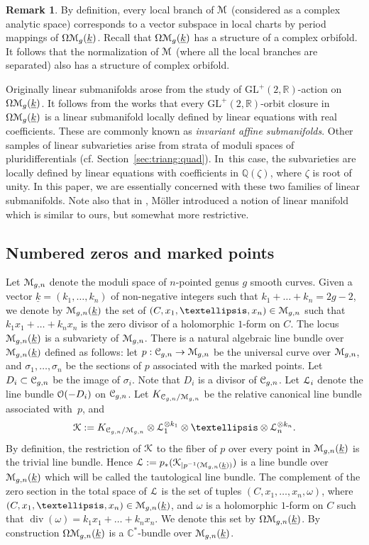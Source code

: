 \documentclass[11pt]{article}
\newcommand{\cf}{cf.\xspace}
\numberwithin{equation}{section}
\let\mathcal\EuScript
\DeclareMathOperator{\Div}{div}
\theoremstyle{plain}
\theoremstyle{definition}
\newtheorem{Remark}[Theorem]{Remark}
\newcommand{\R}{\mathbb{R}}
\def\C{\mathbb{C}}
\newcommand{\Q}{\mathbb{Q}}
\newcommand{\Ccal}{\mathcal{C}}
\newcommand{\Kcal}{\mathcal{K}}
\newcommand{\Lcal}{\mathcal{L}}
\newcommand{\Mcal}{\mathcal{M}}
\newcommand{\Ocal}{\mathcal{O}}
\newcommand{\cM}{\mathcal{M}}
\newcommand{\GL}{\mathrm{GL}}
\let\omg\omega
\let\ul\underline
\newcommand{\trate}{\Omega\Mcal_{g}(\ul{k})}
\begin{document}
\begin{Remark}\label{rk:lin:subman:orbifold}
By definition, every local branch of $\cM$ (considered as a complex analytic space) corresponds to a vector subspace in local charts by period mappings of $\trate$.
Recall that $\trate$ has a structure of a complex orbifold. It follows that the normalization of $\cM$ (where all the local branches are separated) also has a structure of complex orbifold.
\end{Remark}

Originally linear submanifolds arose from the study of $\GL^+(2,\R)$-action on $\trate$. It follows from the works \cite{EM18, EMM15, Filip16} that every $\GL^+(2,\R)$-orbit closure in $\trate$ is a linear submanifold locally defined by linear equations with real coefficients. These are commonly known as \emph{invariant affine submanifolds}. Other samples of linear subvarieties arise from strata of moduli spaces of pluri\-differentials (\cf Section~\ref{sec:triang:quad}). In~this case, the subvarieties are locally defined by linear equations with coefficients in $\Q(\zeta)$, where $\zeta$ is root of unity. In this paper, we are essentially concerned with these two families of linear submanifolds.
Note also that in \cite[Def.\,6.4]{Moller08}, Möller introduced a notion of linear manifold which is similar to ours, but somewhat more restrictive.

\subsection{Numbered zeros and marked points}\label{subsec:numb:zeros}
Let $\cM_{g,n}$ denote the moduli space of $n$-pointed genus $g$ smooth curves. Given a vector $\ul{k}=(k_1,\dots,k_n)$ of non-negative integers such that $k_1+\dots+k_n=2g-2$, we denote by $\cM_{g,n}(\ul{k})$ the set of $(C,x_1,\dots,x_n) \in \cM_{g,n}$ such that $k_1x_1+\dots+k_nx_n$ is the zero divisor of a holomorphic $1$-form on $C$. The locus $\cM_{g,n}(\ul{k})$ is a subvariety of $\cM_{g,n}$. There is a natural algebraic line bundle over $\cM_{g,n}(\ul{k})$ defined as follows: let $p:\Ccal_{g,n}\to \cM_{g,n}$ be the universal curve over $\cM_{g,n}$, and $\sigma_1,\dots,\sigma_n$ be the sections of $p$ associated with the marked points. Let $D_i\subset \Ccal_{g,n}$ be the image of $\sigma_i$. Note that $D_i$ is a divisor of $\Ccal_{g,n}$.
Let $\Lcal_i$ denote the line bundle $\Ocal(-D_i)$ on $\Ccal_{g,n}$. Let $K_{\Ccal_{g,n}/\cM_{g,n}}$ be the relative canonical line bundle associated with~$p$, and
\[
\Kcal:=K_{\Ccal_{g,n}/\cM_{g,n}}\otimes\Lcal_1^{\otimes k_1}\otimes\dots\otimes\Lcal_n^{\otimes k_n}.
\]
By definition, the restriction of $\Kcal$ to the fiber of $p$ over every point in $\cM_{g,n}(\ul{k})$ is the trivial line bundle. Hence $\Lcal:=p_*(\Kcal_{|p^{-1}(\cM_{g,n}(\ul{k}))})$ is a line bundle over $\cM_{g,n}(\ul{k})$ which will be called the tautological line bundle.
The complement of the zero section in the total space of $\Lcal$ is the set of tuples $(C,x_1,\dots,x_n,\omg)$, where $(C,x_1,\dots,x_n) \in\nobreak \cM_{g,n}(\ul{k})$, and $\omg$ is a holomorphic $1$-form on $C$ such that $\Div(\omg)=k_1x_1+\dots+k_nx_n$. We denote this set by $\Omega\cM_{g,n}(\ul{k})$. By construction $\Omega\cM_{g,n}(\ul{k})$ is a $\C^*$-bundle over $\cM_{g,n}(\ul{k})$.
\end{document}
